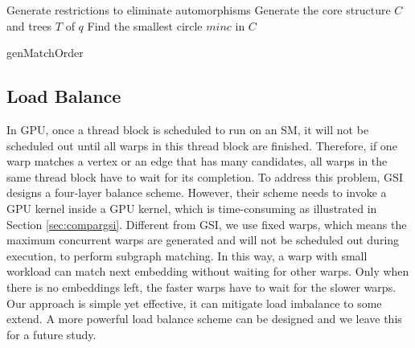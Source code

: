 \begin{algorithm}
	Generate restrictions to eliminate automorphisms\;
	Generate the core structure $C$ and trees $T$ of $q$\;
	Find the smallest circle $minc$ in $C$\;
	
	\caption{genMatchOrder}
	\label{algo:genmatchorder}
\end{algorithm}

\subsection{Load Balance}
In GPU, once a thread block is scheduled to run on an SM, it will not be scheduled out until all warps in this thread block are finished. Therefore, if one warp matches a vertex or an edge that has many candidates, all warps in the same thread block have to wait for its completion. To address this problem, GSI designs a four-layer balance scheme. However, their scheme needs to invoke a GPU kernel inside a GPU kernel, which is time-consuming as illustrated in Section \ref{sec:compargsi}. Different from GSI, we use fixed warps, which means the maximum concurrent warps are generated and will not be scheduled out during execution, to perform subgraph matching. In this way, a warp with small workload can match next embedding without waiting for other warps. Only when there is no embeddings left, the faster warps have to wait for the slower warps. Our approach is simple yet effective, it can mitigate load imbalance to some extend. A more powerful load balance scheme can be designed and we leave this for a future study. 